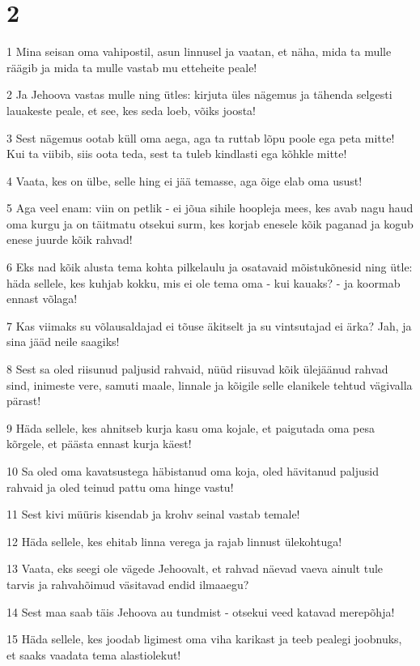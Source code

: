 \chapter{2}

\par 1 Mina seisan oma vahipostil, asun linnusel ja vaatan, et näha, mida ta mulle räägib ja mida ta mulle vastab mu etteheite peale!
\par 2 Ja Jehoova vastas mulle ning ütles: kirjuta üles nägemus ja tähenda selgesti lauakeste peale, et see, kes seda loeb, võiks joosta!
\par 3 Sest nägemus ootab küll oma aega, aga ta ruttab lõpu poole ega peta mitte! Kui ta viibib, siis oota teda, sest ta tuleb kindlasti ega kõhkle mitte!
\par 4 Vaata, kes on ülbe, selle hing ei jää temasse, aga õige elab oma usust!
\par 5 Aga veel enam: viin on petlik - ei jõua sihile hoopleja mees, kes avab nagu haud oma kurgu ja on täitmatu otsekui surm, kes korjab enesele kõik paganad ja kogub enese juurde kõik rahvad!
\par 6 Eks nad kõik alusta tema kohta pilkelaulu ja osatavaid mõistukõnesid ning ütle: häda sellele, kes kuhjab kokku, mis ei ole tema oma - kui kauaks? - ja koormab ennast võlaga!
\par 7 Kas viimaks su võlausaldajad ei tõuse äkitselt ja su vintsutajad ei ärka? Jah, ja sina jääd neile saagiks!
\par 8 Sest sa oled riisunud paljusid rahvaid, nüüd riisuvad kõik ülejäänud rahvad sind, inimeste vere, samuti maale, linnale ja kõigile selle elanikele tehtud vägivalla pärast!
\par 9 Häda sellele, kes ahnitseb kurja kasu oma kojale, et paigutada oma pesa kõrgele, et päästa ennast kurja käest!
\par 10 Sa oled oma kavatsustega häbistanud oma koja, oled hävitanud paljusid rahvaid ja oled teinud pattu oma hinge vastu!
\par 11 Sest kivi müüris kisendab ja krohv seinal vastab temale!
\par 12 Häda sellele, kes ehitab linna verega ja rajab linnust ülekohtuga!
\par 13 Vaata, eks seegi ole vägede Jehoovalt, et rahvad näevad vaeva ainult tule tarvis ja rahvahõimud väsitavad endid ilmaaegu?
\par 14 Sest maa saab täis Jehoova au tundmist - otsekui veed katavad merepõhja!
\par 15 Häda sellele, kes joodab ligimest oma viha karikast ja teeb pealegi joobnuks, et saaks vaadata tema alastiolekut!
